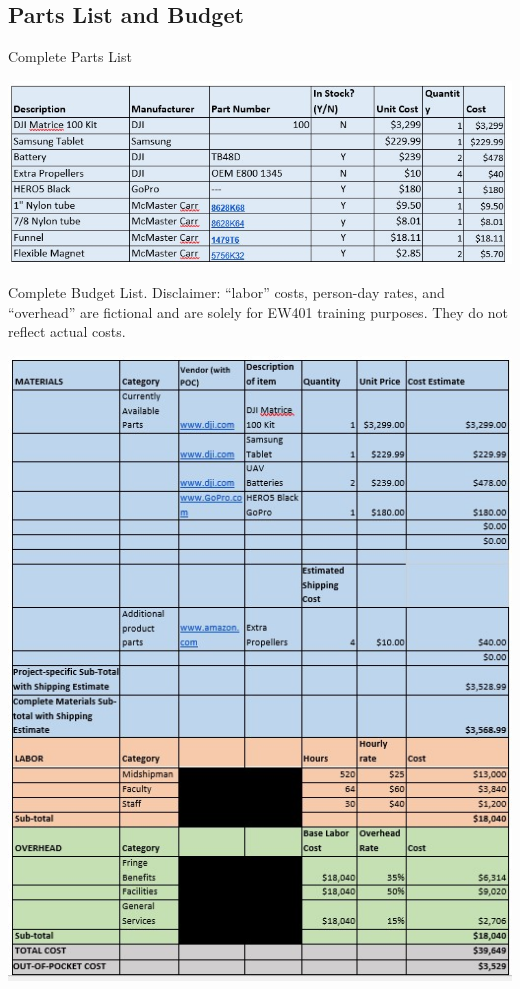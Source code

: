 \documentclass{wrcecapstone}
\begin{document}
\subsection{Parts List and Budget}
\begin{table}
\caption{Complete Parts List}
\label{tab:7.2.1}
\begin{center}
\includegraphics[width=\columnwidth]{figures/table-721.jpg}
\end{center}
\end{table}
\begin{table}
\caption{Complete Budget List. Disclaimer: ``labor'' costs, person-day rates, and ``overhead'' are fictional and are solely for EW401 training purposes. They do not reflect actual costs.}
\label{tab:7.2.2}
\begin{center}
\includegraphics[width=\columnwidth]{figures/table-722.jpg}
\end{center}
\end{table}
\end{document}
